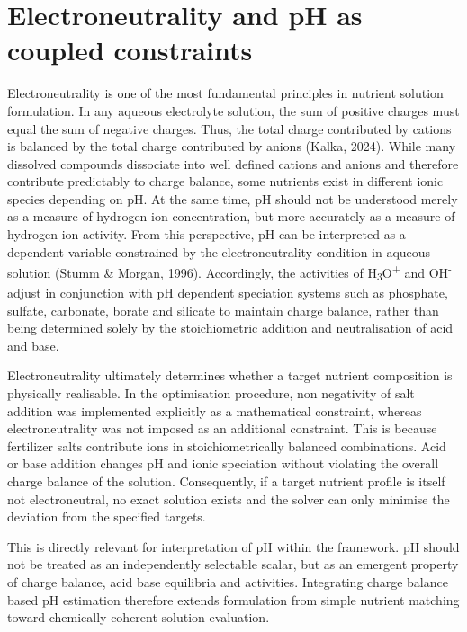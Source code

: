 \documentclass[
  letterpaper,
  DIV=11,
  numbers=noendperiod]{scrreprt}
\begin{document}
\section{Electroneutrality and pH as coupled
constraints}\label{electroneutrality-and-ph-as-coupled-constraints}

Electroneutrality is one of the most fundamental principles in nutrient
solution formulation. In any aqueous electrolyte solution, the sum of
positive charges must equal the sum of negative charges. Thus, the total
charge contributed by cations is balanced by the total charge
contributed by anions (Kalka, 2024). While many dissolved compounds
dissociate into well defined cations and anions and therefore contribute
predictably to charge balance, some nutrients exist in different ionic
species depending on pH. At the same time, pH should not be understood
merely as a measure of hydrogen ion concentration, but more accurately
as a measure of hydrogen ion activity. From this perspective, pH can be
interpreted as a dependent variable constrained by the electroneutrality
condition in aqueous solution (Stumm \& Morgan, 1996). Accordingly, the
activities of H\textsubscript{3}O\textsuperscript{+} and
OH\textsuperscript{-} adjust in conjunction with pH dependent speciation
systems such as phosphate, sulfate, carbonate, borate and silicate to
maintain charge balance, rather than being determined solely by the
stoichiometric addition and neutralisation of acid and base.

Electroneutrality ultimately determines whether a target nutrient
composition is physically realisable. In the optimisation procedure, non
negativity of salt addition was implemented explicitly as a mathematical
constraint, whereas electroneutrality was not imposed as an additional
constraint. This is because fertilizer salts contribute ions in
stoichiometrically balanced combinations. Acid or base addition changes
pH and ionic speciation without violating the overall charge balance of
the solution. Consequently, if a target nutrient profile is itself not
electroneutral, no exact solution exists and the solver can only
minimise the deviation from the specified targets.

This is directly relevant for interpretation of pH within the framework.
pH should not be treated as an independently selectable scalar, but as
an emergent property of charge balance, acid base equilibria and
activities. Integrating charge balance based pH estimation therefore
extends formulation from simple nutrient matching toward chemically
coherent solution evaluation.
\end{document}
